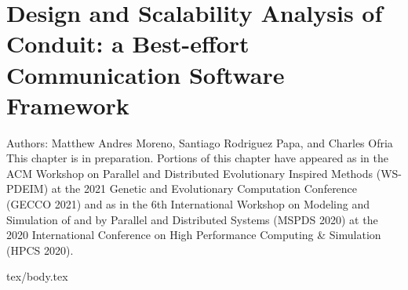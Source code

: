 \chapter{Design and Scalability Analysis of Conduit: a Best-effort Communication Software Framework}
\label{ch:conduit}

\noindent
Authors: Matthew Andres Moreno, Santiago Rodriguez Papa, and Charles Ofria \\
This chapter is in preparation.
Portions of this chapter have appeared as \citep{moreno2021conduit} in the ACM Workshop on Parallel and Distributed Evolutionary Inspired Methods (WS-PDEIM) at the 2021 Genetic and Evolutionary Computation Conference (GECCO 2021) and as \citep{moreno2020conduit} in the 6th International Workshop on Modeling and Simulation of and by Parallel and Distributed Systems (MSPDS 2020) at the 2020 International Conference on High Performance Computing \& Simulation (HPCS 2020).

{tex/body.tex}
